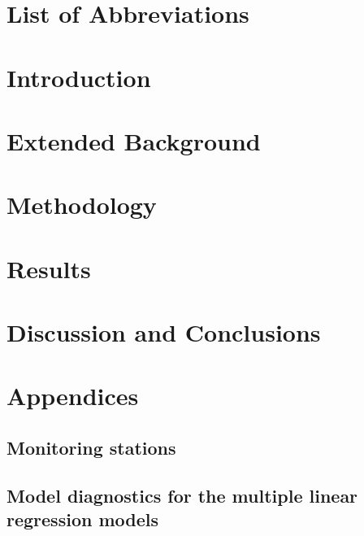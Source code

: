 \documentclass[12pt]{report}
\numberwithin{equation}{section}
\begin{document}
\listoftables
\thispagestyle{plain}

\chapter*{List of Abbreviations}


\chapter{Introduction}
\setcounter{page}{1}


\chapter{Extended Background}


\chapter{Methodology}


\chapter{Results}


\chapter{Discussion and Conclusions}


{}

%

%
\chapter*{Appendices}
\setcounter{section}{0}
\renewcommand\thesection{\Alph{section}}

\section{Monitoring stations}

\section{Model diagnostics for the multiple linear regression models}

\end{document}
